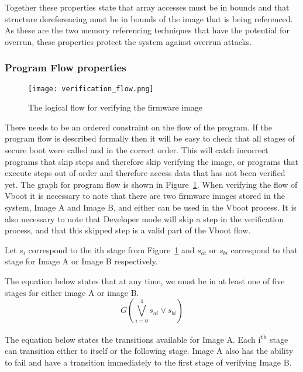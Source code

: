 \documentclass[../report.tex]{subfiles}
\begin{document}
Together these properties state that array accesses must be in bounds and that structure dereferencing must be in bounds of the image that is being referenced.
As these are the two memory referencing techniques that have the potential for overrun, these properties protect the system against overrun attacks.

\subsubsection{Program Flow properties}

\begin{figure}
  \centering
  \texttt{[image: verification\_flow.png]}
  \caption{The logical flow for verifying the firmware image}\label{fig:verif_flow}
\end{figure}

There needs to be an ordered constraint on the flow of the program. 
If the program flow is described formally then it will be easy to check that all stages of secure boot were called and in the correct order.
This will catch incorrect programs that skip steps and therefore skip verifying the image, or programs that execute steps out of order and therefore access data that has not been verified yet.
The graph for program flow is shown in Figure~\ref{fig:verif_flow}.
When verifying the flow of Vboot it is necessary to note that there are two firmware images stored in the system, Image A and Image B, and either can be used in the Vboot process. 
It is also necessary to note that Developer mode will skip a step in the verification process, and that this skipped step is a valid part of the Vboot flow.

Let $s_i$ correspond to the ith stage from Figure~\ref{fig:verif_flow} and $s_{ai}$ or $s_{bi}$ correspond to that stage for Image A or Image B respectively.

The equation below states that at any time, we must be in at least one of five stages for either image A or image B.
\begin{equation}
    G(\bigvee\limits_{i = 0}^{4} s_{ai} \lor s_{bi})
\end{equation}

The equation below states the transitions available for Image A.
Each i\textsuperscript{th} stage can transition either to itself or the following stage.
Image A also has the ability to fail and have a transition immediately to the first stage of verifying Image B.
\end{document}

